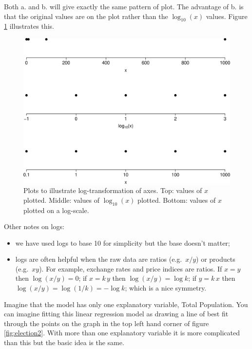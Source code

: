 \documentclass[
  british,
]{book}
\providecommand{\tightlist}{%
  \setlength{\itemsep}{0pt}\setlength{\parskip}{0pt}}
\begin{document}
Both a. and b. will give exactly the same pattern of plot. The advantage of b. is that the original values are on the plot rather than the \(\log_{10}(x)\)
values. Figure \ref{fig:logaxes} illustrates this.

\begin{figure}

{\centering \includegraphics[width=0.8\linewidth]{images/log_axes} 

}

\caption{Plots to illustrate log-transformation of axes. Top: values of $x$ plotted. Middle: values of $\log_{10}(x)$ plotted. Bottom: values of $x$ plotted on a log-scale.}\label{fig:logaxes}
\end{figure}
\FloatBarrier

Other notes on logs:

\begin{itemize}
\tightlist
\item
  we have used logs to base 10 for simplicity but the base doesn't matter;
\item
  logs are often helpful when the raw data are ratios (e.g.~\(x/y\)) or products (e.g.~\(xy\)). For example, exchange rates and price indices are ratios. If \(x=y\) then \(\log (x/y)=0\); if \(x=k\,y\) then \(\log (x/y)=\log k\); if \(y=k\,x\) then \(\log (x/y)=\log(1/k)=-\log k\); which is a nice symmetry.
\end{itemize}

Imagine that the model has only one explanatory variable, Total Population. You can imagine fitting this linear regression model as drawing a line of best fit through the points on the graph in the top left hand corner of figure \ref{fig:election2}. With more than one explanatory variable it is more complicated than this but the basic idea is the same.
\end{document}

